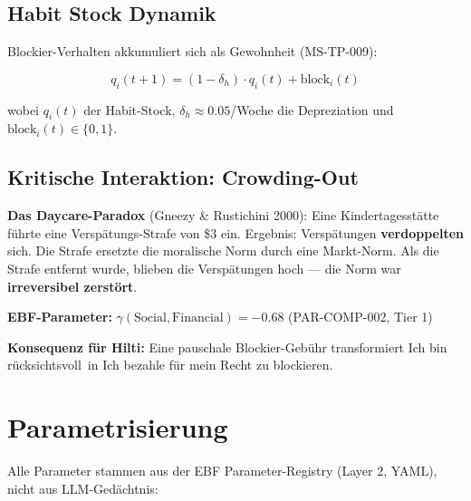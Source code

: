 \documentclass[11pt,a4paper]{article}
\begin{document}
\subsection{Habit Stock Dynamik}

Blockier-Verhalten akkumuliert sich als Gewohnheit (MS-TP-009):

\begin{equation}
q_i(t+1) = (1 - \delta_h) \cdot q_i(t) + \text{block}_i(t)
\end{equation}

wobei $q_i(t)$ der Habit-Stock, $\delta_h \approx 0.05$/Woche die Depreziation und $\text{block}_i(t) \in \{0,1\}$.

\subsection{Kritische Interaktion: Crowding-Out}

\begin{warningbox}
\textbf{Das Daycare-Paradox} (Gneezy \& Rustichini 2000): Eine Kindertagesst\"atte f\"uhrte eine Versp\"atungs-Strafe von \$3 ein. Ergebnis: Versp\"atungen \textbf{verdoppelten} sich. Die Strafe ersetzte die moralische Norm durch eine Markt-Norm. Als die Strafe entfernt wurde, blieben die Versp\"atungen hoch --- die Norm war \textbf{irreversibel zerst\"ort}.

\vspace{6pt}
\textbf{EBF-Parameter:} $\gamma(\text{Social}, \text{Financial}) = -0.68$ \quad (PAR-COMP-002, Tier 1)

\vspace{6pt}
\textbf{Konsequenz f\"ur Hilti:} Eine pauschale Blockier-Geb\"uhr transformiert \guillemotleft Ich bin r\"ucksichtsvoll\guillemotright\ in \guillemotleft Ich bezahle f\"ur mein Recht zu blockieren\guillemotright.
\end{warningbox}


\section{Parametrisierung}

Alle Parameter stammen aus der EBF Parameter-Registry (Layer 2, YAML), nicht aus LLM-Ged\"achtnis:
\end{document}

